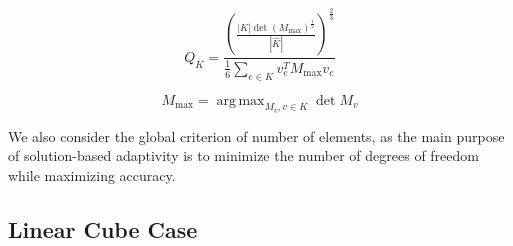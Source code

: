 \documentclass[3p,times,procedia,number]{elsarticle}
\DeclareMathOperator*{\argmax}{arg\,max}
\begin{document}
\begin{equation}
\label{eq:quality}
Q_K =
 \frac{\left(\frac{|K|\det(M_{\text{max}})^{\frac12}}
                  {|\hat{K}|}
       \right)^{\frac{2}{3}}}
      {\frac16\sum_{e\in K}{v_e^T M_{\text{max}} v_e}}
\end{equation}

\begin{equation}
\label{eq:max_metric}
M_{\text{max}} = \argmax_{M_v, v\in K}{\det{M_v}}
\end{equation}

We also consider the global criterion of number of elements,
as the main purpose of solution-based adaptivity is to
minimize the number of degrees of freedom while maximizing
accuracy.

\subsection{Linear Cube Case}
\end{document}
